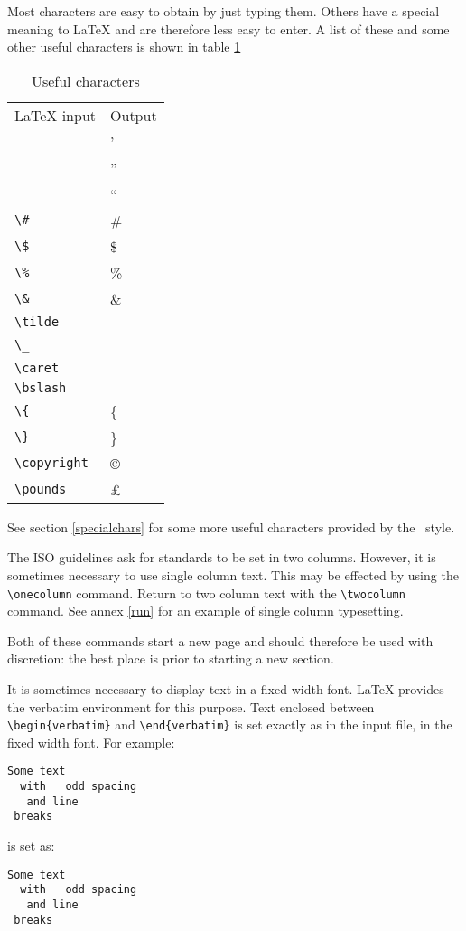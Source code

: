 \label{guide.unusual}
Most \cite{charset} characters are easy to obtain by just typing them.
Others have a special meaning to LaTeX and are therefore less easy to enter.
A list of these and some other useful characters is shown in table
\ref{table.chars}
\begin{table}[ht]
\begin{center}
\begin{tabular}{ll}
LaTeX input	&	Output \\
\prog{\rquote}	&	' \\
\prog{\rquote\rquote}	&	'' \\
\prog{\lquote\lquote}	&	`` \\
\verb|\#|	&	\# \\
\verb|\$|	&	\$ \\
\verb|\%|	&	\% \\
\verb|\&|	&	\& \\
\verb|\tilde|	&	\tilde \\
\verb|\_|	&	\_ \\
\verb|\caret|	&	\caret \\
\verb|\bslash|	&	\bslash \\
\verb|\{|	&	\{ \\
\verb|\}|	&	\} \\
\verb|\copyright|	&	\copyright \\
\verb|\pounds|	&	\pounds
\end{tabular}
\end{center}
\caption{Useful characters}
\label{table.chars}
\end{table}

See section \ref{specialchars} for some more useful characters provided by
the \iso\ style.

The ISO guidelines ask for standards to be set in two columns.
However, it is sometimes necessary to use single column text.
This may be effected by using the \verb|\onecolumn| command.
Return to two column text with the \verb|\twocolumn| command.
See annex \ref{run} for an example of single column typesetting.

Both of these commands start a new page and should therefore be used with
discretion: the best place is prior to starting a new section.

\label{guide.verbatim}
It is sometimes necessary to display text in a fixed width font.
LaTeX provides the verbatim environment for this purpose.
Text enclosed between \verb|\begin{verbatim}| and
\verb|\end{verbatim}| is set exactly as in the input file, in the fixed
width font.
For example:
\begin{example}
\begin{verbatim}
Some text
  with   odd spacing
   and line
 breaks
\end{verbatim}
\end{example}
is set as:
\begin{verbatim}
Some text
  with   odd spacing
   and line
 breaks
\end{verbatim}

